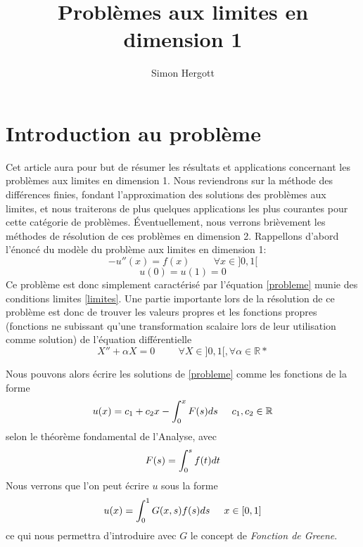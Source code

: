 \documentclass[12pt]{article}
\title{Problèmes aux limites en dimension 1} %
\author{Simon Hergott} %
\newcommand{\R}{\mathbb R}
\newcommand{\espace}{\hspace{5mm}}
\begin{document}
	\maketitle
	
\section{Introduction au problème}

\quad Cet article aura pour but de résumer les résultats et applications concernant les problèmes aux limites en dimension 1. Nous reviendrons sur la méthode des différences finies, fondant l'approximation des solutions des problèmes aux limites, et nous traiterons de plus quelques applications les plus courantes pour cette catégorie de problèmes. Éventuellement, nous verrons brièvement les méthodes de résolution de ces problèmes en dimension 2.
Rappellons d'abord l'énoncé du modèle du problème aux limites en dimension 1:
\begin{equation}\label{probleme}
-u''(x) = f(x) \hspace{1cm} \forall x \in ]0,1[ 
\end{equation}
\begin{equation}\label{limites}
u(0) = u(1) = 0
\end{equation}
\quad Ce problème est donc simplement caractérisé par l'équation \eqref{probleme} munie des conditions limites \eqref{limites}. Une partie importante lors de la résolution de ce problème est donc de trouver les valeurs propres et les fonctions propres (fonctions ne subissant qu'une transformation scalaire lors de leur utilisation comme solution) de l'équation différentielle
\begin{equation}
	X'' + \alpha X = 0 \hspace{1cm} \forall X \in ]0,1[ , \forall \alpha \in \mathbb R*
\end{equation}

\quad Nous pouvons alors écrire les solutions de \eqref{probleme} comme les fonctions de la forme
\begin{equation}
\label{solutionsNaives}
	u\relax(x) = c_1 + c_2 x - \int_0^x F(s) ds \espace c_1 , c_2 \in \R
\end{equation}
selon le théorème fondamental de l'Analyse, avec 
\begin{equation}
	F\relax(s) = \int_0^s f(t) dt
\end{equation}
\quad Nous verrons que l'on peut écrire $u$ sous la forme
\begin{equation}
	u\relax(x) = \int_0^1 G\relax(x, s) f\relax(s) ds \espace x \in [0, 1]
\end{equation}
ce qui nous permettra d'introduire avec $G$ le concept de \emph{Fonction de Greene}.
\end{document}
